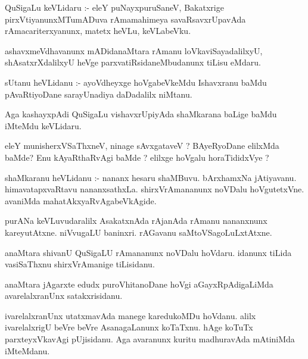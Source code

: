 \documentclass{article}
\begin{document}
\begin{mn}
QuSigaLu  keVLidaru :- eleY  puNayxpuruSaneV,  Bakatxrige  pirxVtiyanunxMTumADuva  rAmamahimeya  savaRsavxrUpavAda  
rAmacariterxyanunx,  matetx  heVLu,  keVLabeVku.
\end{mn}

\begin{mn}
ashavxmeVdhavanunx  mADidanaMtara  rAmanu  loVkaviSayadalilxyU,  shAsatxrXdalilxyU  heVge  parxvatiRsidaneMbudanunx  
tiLisu  eMdaru.
\end{mn}

\begin{mn}
sUtanu  heVLidanu :- ayoVdheyxge  hoVgabeVkeMdu  Ishavxranu  baMdu  pAvaRtiyoDane  sarayUnadiya  daDadalilx  niMtanu.
\end{mn}

\begin{mn}
Aga  kashayxpAdi QuSigaLu  vishavxrUpiyAda  shaMkarana  baLige  baMdu  iMteMdu  keVLidaru.
\end{mn}

\begin{mn}
eleY  munisherxVSaThxneV,  ninage  sAvxgataveV ?  BAyeRyoDane  elilxMda  baMde?  Enu  kAyaRthaRvAgi  baMde ?  elilxge  
hoVgalu  horaTididxVye ?
\end{mn}

\begin{mn}
shaMkaranu  heVLidanu :- nananx  hesaru  shaMBuvu.  bArxhamxNa jAtiyavanu.  himavatapxvaRtavu  nananxsathxLa.  
shirxVrAmananunx  noVDalu  hoVgutetxVne.  avaniMda  mahatAkxyaRvAgabeVkAgide.
\end{mn}

\begin{mn} 
purANa  keVLuvudaralilx  AsakatxnAda  rAjanAda  rAmanu  nananxnunx  kareyutAtxne.  niVvugaLU  baninxri.  rAGavanu  
saMtoVSagoLuLxtAtxne.
\end{mn}

\begin{mn}
anaMtara  shivanU  QuSigaLU  rAmananunx  noVDalu  hoVdaru.  idanunx  tiLida  vasiSaThxnu  shirxVrAmanige  tiLisidanu.
\end{mn}

\begin{mn}
anaMtara  jAgarxte  edudx  puroVhitanoDane  hoVgi  aGayxRpAdigaLiMda  avarelalxranUnx  satakxrisidanu.
\end{mn}

\begin{mn}
ivarelalxranUnx  utatxmavAda  manege  karedukoMDu  hoVdanu.  alilx  ivarelalxrigU  beVre  beVre  AsanagaLanunx  koTaTxnu.  
hAge  koTuTx  parxteyxVkavAgi  pUjisidanu.  Aga  avaranunx  kuritu  madhuravAda  mAtiniMda  iMteMdanu.
\end{mn}
\end{document}
